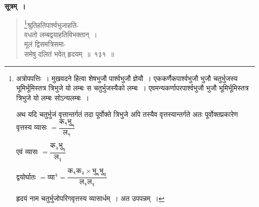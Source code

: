 \documentclass[11pt, openany]{book}
\begin{document}
\textbf{सूत्रम्~।} 
\begin{quote}
    \bs 
    \footnote{अत्रोपपत्तिः~। मुखवदने हित्वा शेषभुजौ पार्श्वभुजौ ज्ञेयौ~।
एककर्णैकपार्श्वभुजौ भुजौ चतुर्भुजस्य भूमिर्भूमिस्तत्र त्रिभुजे यो लम्बः
स चतुर्भुजस्यैको लम्बः~। एवमन्यकर्णापरपार्श्वभुजौ भुजौ
भूमिर्भूमिस्तत्र त्रिभुजे यो लम्बः सोऽन्यलम्बः~। 

\vspace{1mm}
\hspace{3mm} अथ यदि चतुर्भुजं वृत्तान्तर्गतं तदा पूर्वोक्ते त्रिभुजे अपि
तस्यैव वृत्तस्यान्तर्गते अतः पूर्वोक्तप्रकारेण वृत्तस्य व्यासः $=
\dfrac{\mbox{क}_{\text{१}}\mbox{भु}_{\text{१}}}{\mbox{ल}_{\text{१}}}$

\vspace{1mm}
\hspace{8mm} एवं व्यासः $= \dfrac{\mbox{क}_{\text{२}}\mbox{भु}_{\text{२}}}{\mbox{ल}_{\text{२}}}$

\vspace{1mm}
\hspace{3mm} द्वयोर्घातः $= \mbox{व्या}^{\text{२}} = \dfrac{\mbox{क}_{\text{१}}\mbox{क}_{\text{२}} \times \mbox{भु}_{\text{१}}\mbox{भु}_{\text{२}}}{\mbox{ल}_{\text{१}}\mbox{ल}_{\text{२}}}$

\vspace{1mm}
\hspace{3mm} हृदयं नाम चतुर्भुजोपरिगवृत्तस्य व्यासार्धम्~। अत उपपन्नम्~।}श्रुतिहतिपार्श्वभुजाहति-\\
वधतो लम्बद्वयाहतिविभक्तान्~। \\
मूलं द्विसमत्रिसमा-\\
समेषु दलितं भवेत् हृदयम्~॥~१३१~॥~
\end{quote}
\newpage%
\end{document}
